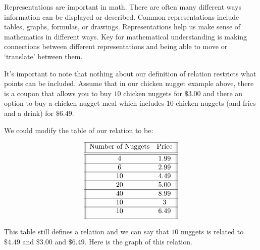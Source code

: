 \documentclass[nooutcomes]{ximera}
\begin{document}
\begin{MM}
Representations are important in math. There are often many different ways information can be displayed or described. Common representations include tables, graphs, formulas, or drawings. Representations help us make sense of mathematics in different ways. Key for mathematical understanding is making connections between different representations and being able to move or `translate' between them.
\end{MM}



\begin{example}
It's important to note that nothing about our definition of relation
restricts what points can be included.  Assume that in our chicken
nugget example above, there is a coupon that allows you to buy $10$
chicken nuggets for $\$3.00$ and there an option to buy a chicken
nugget meal which includes $10$ chicken nuggets (and fries and a
drink) for $\$6.49$.

\begin{explanation}
We could modify the table of our relation to be:

$$
 \begin{array}{||c c||} 
 \hline
 \text{Number of Nuggets} & \text{Price} \\[0.5ex] 
 \hline\hline
 4 & 1.99\\ 
 \hline
 6 & 2.99 \\
 \hline
 10 & 4.49\\
 \hline
 20 & 5.00 \\
 \hline
 40 & 8.99\\ 
 \hline
 10 & 3 \\
 \hline
 10 & 6.49\\[1ex] 
 \hline
\end{array}
$$


This table still defines a relation and we can say that $10$ nuggets is
related to $\$4.49$ and $\$3.00$ and $\$6.49$. Here is the graph of
this relation.


\end{explanation}
\end{example}
\end{document}
